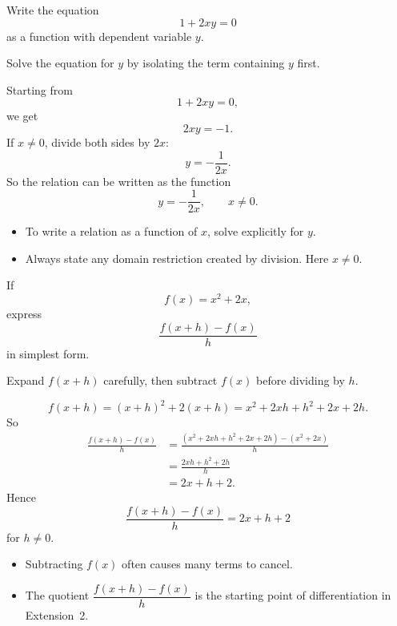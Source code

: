 
\begin{problem}
Write the equation
\[
1+2xy=0
\]
as a function with dependent variable $y$.
\end{problem}

\begin{hint}
Solve the equation for $y$ by isolating the term containing $y$ first.
\end{hint}

\begin{solution}
Starting from
\[
1+2xy=0,
\]
we get
\[
2xy=-1.
\]
If $x\ne 0$, divide both sides by $2x$:
\[
y=-\frac{1}{2x}.
\]
So the relation can be written as the function
\[
\boxed{y=-\frac{1}{2x}}, \qquad x\ne 0.
\]
\end{solution}

\begin{takeaways}
\begin{itemize}[leftmargin=*]
\item To write a relation as a function of $x$, solve explicitly for $y$.
\item Always state any domain restriction created by division. Here $x\ne 0$.
\end{itemize}
\end{takeaways}

\begin{problem}
If
\[
f(x)=x^2+2x,
\]
express
\[
\frac{f(x+h)-f(x)}{h}
\]
in simplest form.
\end{problem}

\begin{hint}
Expand $f(x+h)$ carefully, then subtract $f(x)$ before dividing by $h$.
\end{hint}

\begin{solution}
\[
f(x+h)=(x+h)^2+2(x+h)=x^2+2xh+h^2+2x+2h.
\]
So
\begin{align*}
\frac{f(x+h)-f(x)}{h}
&=\frac{(x^2+2xh+h^2+2x+2h)-(x^2+2x)}{h}\\
&=\frac{2xh+h^2+2h}{h}\\
&=2x+h+2.
\end{align*}
Hence
\[
\boxed{\frac{f(x+h)-f(x)}{h}=2x+h+2}
\]
for $h\ne 0$.
\end{solution}

\begin{takeaways}
\begin{itemize}[leftmargin=*]
\item Subtracting $f(x)$ often causes many terms to cancel.
\item The quotient $\dfrac{f(x+h)-f(x)}{h}$ is the starting point of differentiation in Extension~2.
\end{itemize}
\end{takeaways}

